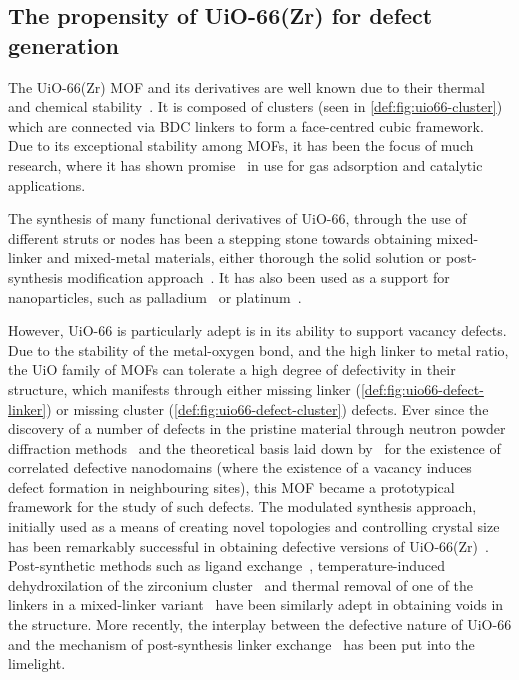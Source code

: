 \subsection{The propensity of UiO-66(Zr) for defect generation}

The UiO-66(Zr) \gls{MOF} and its derivatives are well known due to
their thermal and chemical stability~\cite{cavkaNewZirconiumInorganic2008}.
It is composed of  clusters
(seen in \autoref{def:fig:uio66-cluster}) which are connected
via \gls{BDC} linkers to form a face-centred cubic
framework. Due to its exceptional stability among \glspl{MOF}, it has been the
focus of much research, where it has shown
promise~\cite{wiersumEvaluationUiO66GasBased2011} in use for gas
adsorption and catalytic applications.

The synthesis of many functional derivatives of UiO-66,
through the use of different struts or nodes has been a stepping 
stone towards obtaining mixed-linker and mixed-metal materials, 
either thorough the solid solution or post-synthesis modification
approach~\cite{kimPostsyntheticLigandExchange2012}.
It has also been used as a support for nanoparticles, such
as palladium~\cite{shenHighlyDispersedPalladium2013}
or platinum~\cite{oienProbingReactivePlatinum2015}.

However, UiO-66 is particularly adept is in its ability to support
vacancy defects. Due to the stability of the metal-oxygen bond, and the
high linker to metal ratio, the UiO family of \glspl{MOF} can tolerate
a high degree of defectivity in their structure, which manifests through
either missing linker
(\autoref{def:fig:uio66-defect-linker}) or missing
cluster (\autoref{def:fig:uio66-defect-cluster}) defects.
Ever since the discovery of a number of
defects in the pristine material through neutron powder diffraction
methods~\cite{wuUnusualHighlyTunable2013} and the theoretical
basis laid down by~\citet{cliffeCorrelatedDefectNanoregions2014}
for the existence of correlated defective nanodomains (where the
existence of a vacancy induces defect formation in neighbouring
sites), this \gls{MOF} became a prototypical framework for the study of
such defects.
The modulated synthesis approach, initially used as
a means of creating novel topologies and controlling crystal
size~\cite{guillermZirconiumMethacrylateOxocluster2010}
has been remarkably successful in obtaining defective versions
of UiO-66(Zr)~\cite{shearerDefectEngineeringTuning2016}.
Post-synthetic methods such as ligand
exchange~\cite{shearerFunctionalizingDefectsPostsynthetic2016},
temperature-induced dehydroxilation of the zirconium
cluster~\cite{valenzanoDisclosingComplexStructure2011} and
thermal removal of one of the linkers in a mixed-linker
variant~\cite{buekenTacklingDefectConundrum2017} have been
similarly adept in obtaining voids in the structure.
More recently, the interplay between the 
defective nature of UiO-66 and the mechanism of 
post-synthesis linker exchange~\cite{taddeiPostsyntheticLigandExchange2018}
has been put into the limelight.



